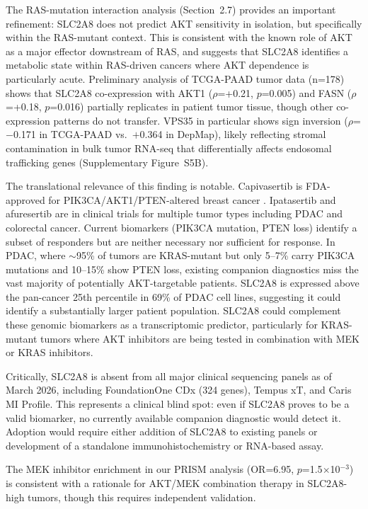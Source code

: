 \documentclass[12pt]{article}
\begin{document}
The RAS-mutation interaction analysis (Section~2.7) provides an important
refinement: SLC2A8 does not predict AKT sensitivity in isolation, but
specifically within the RAS-mutant context. This is consistent with the
known role of AKT as a major effector downstream of RAS, and suggests
that SLC2A8 identifies a metabolic state within RAS-driven cancers where
AKT dependence is particularly acute. Preliminary analysis of TCGA-PAAD
tumor data (n=178) shows that SLC2A8 co-expression with AKT1
($\rho$=+0.21, $p$=0.005) and FASN ($\rho$=+0.18, $p$=0.016) partially
replicates in patient tumor tissue, though other co-expression patterns
do not transfer. VPS35 in particular shows sign inversion
($\rho$=$-$0.171 in TCGA-PAAD vs.\ $+$0.364 in DepMap), likely
reflecting stromal contamination in bulk tumor RNA-seq that
differentially affects endosomal trafficking genes
(Supplementary Figure~S5B).

The translational relevance of this finding is notable. Capivasertib
is FDA-approved for PIK3CA/AKT1/PTEN-altered breast cancer
\citep{Turner2023}. Ipatasertib and afuresertib are in clinical trials
for multiple tumor types including PDAC and colorectal cancer. Current
biomarkers (PIK3CA mutation, PTEN loss) identify a subset of responders
but are neither necessary nor sufficient for response. In PDAC, where
$\sim$95\% of tumors are KRAS-mutant but only 5--7\% carry PIK3CA
mutations and 10--15\% show PTEN loss, existing companion diagnostics
miss the vast majority of potentially AKT-targetable patients. SLC2A8 is
expressed above the pan-cancer 25th percentile in 69\% of PDAC cell lines,
suggesting it could identify a substantially larger patient population.
SLC2A8 could complement these genomic biomarkers as a transcriptomic
predictor, particularly for KRAS-mutant tumors where AKT inhibitors are
being tested in combination with MEK or KRAS inhibitors.

Critically, SLC2A8 is absent from all major clinical sequencing panels as
of March 2026, including FoundationOne CDx (324 genes), Tempus xT, and
Caris MI Profile. This represents a clinical blind spot: even if SLC2A8
proves to be a valid biomarker, no currently available companion diagnostic
would detect it. Adoption would require either addition of SLC2A8 to
existing panels or development of a standalone immunohistochemistry or
RNA-based assay.

The MEK inhibitor enrichment in our PRISM analysis (OR=6.95,
$p$=1.5$\times$10$^{-3}$) is consistent with a rationale for AKT/MEK
combination therapy in SLC2A8-high tumors, though this requires
independent validation.
\end{document}
